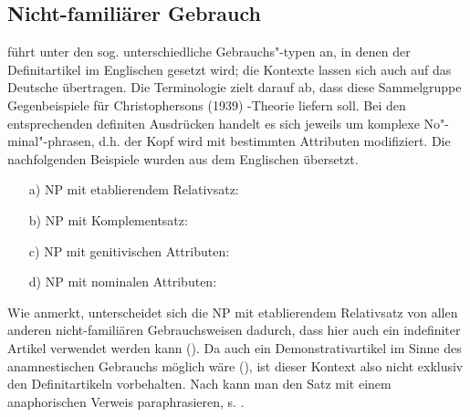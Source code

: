 \subsection{Nicht-familiärer Gebrauch}\label{sec:nicht-fam}

\textcite[130--149]{Hawkins1978} führt unter den sog.  unterschiedliche Gebrauchs"-typen an, in denen der Definitartikel im Englischen gesetzt wird; die Kontexte lassen sich auch auf das Deutsche übertragen. Die Terminologie zielt darauf ab, dass diese Sammelgruppe Gegenbeispiele für Christophersons (1939) -Theorie liefern soll. Bei den entsprechenden definiten Ausdrücken handelt es sich jeweils um komplexe No"-minal"-phrasen, d.h. der Kopf wird mit bestimmten Attributen modifiziert. Die nachfolgenden Beispiele \parencite[vgl. die Übersicht in][37]{Himmelmann1997} wurden aus dem Englischen übersetzt.
 
\begin{itemize} 
		\item[a)] \label{etab} NP mit etablierendem Relativsatz: \\  
		\item[b)] \label{komp} NP mit Komplementsatz: \\  
		\item[c)] \label{gen-attr} NP mit genitivischen Attributen: \\ 
		\item[d)] \label{n-attr} NP mit nominalen Attributen: \\ 
\end{itemize}

Wie \textcite[38]{Himmelmann1997} anmerkt, unterscheidet sich die NP mit etablierendem Relativsatz von allen anderen nicht-familiären Gebrauchsweisen dadurch, dass hier auch ein indefiniter Artikel verwendet werden kann (). Da auch ein Demonstrativartikel im Sinne des anamnestischen Gebrauchs möglich wäre (), ist dieser Kontext also nicht exklusiv den Definitartikeln vorbehalten. Nach \textcite[308]{Lobner1985} kann man den Satz mit einem anaphorischen Verweis paraphrasieren, s. . %


